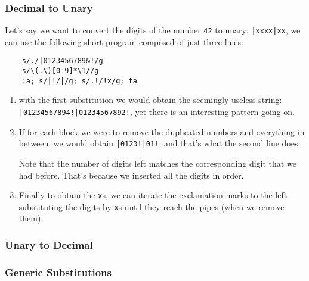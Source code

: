 \subsubsection{Decimal to Unary}

Let's say we want to convert the digits of the number {\tt 42} to unary:
{\tt |xxxx|xx}, we can use the following short program composed of just three
lines:

\begin{Verbatim}
	s/./|0123456789&!/g
	s/\(.\)[0-9]*\1//g
	:a; s/|!/|/g; s/.!/!x/g; ta
\end{Verbatim}

\begin{enumerate}
	\item with the first substitution we would obtain the seemingly useless
		string: {\tt |01234567894!|01234567892!}, yet there is an interesting
		pattern going on.
	\item If for each block we were to remove the duplicated numbers and
		everything in between, we would obtain {\tt |0123!|01!}, and that's
		what the second line does.

		Note that the number of digits left matches the corresponding digit
		that we had before.  That's because we inserted all the digits in order.

	\item Finally to obtain the {\tt x}s, we can iterate the exclamation marks
		to the left substituting the digits by {\tt x}s until they reach the
		pipes (when we remove them).
\end{enumerate}

\subsubsection{Unary to Decimal}

\subsubsection{Generic Substitutions}

